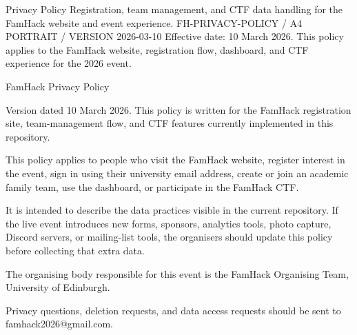 \documentclass[11pt]{article}
\begin{document}
\FHCover
  {Privacy Policy}
  {Registration, team management, and CTF data handling for the FamHack website and event experience.}
  {FH-PRIVACY-POLICY / A4 PORTRAIT / VERSION 2026-03-10}
  {Effective date: 10 March 2026.\newline
  This policy applies to the FamHack website, registration flow, dashboard, and CTF experience for the 2026 event.}

{\fhbold\fontsize{18}{18}\selectfont FamHack Privacy Policy\par}
\vspace{0.3em}
Version dated 10 March 2026. This policy is written for the FamHack registration site, team-management flow, and CTF features currently implemented in this repository.


\vspace{0.6em}

This policy applies to people who visit the FamHack website, register interest in the event, sign in using their university email address, create or join an academic family team, use the dashboard, or participate in the FamHack CTF.

It is intended to describe the data practices visible in the current repository. If the live event introduces new forms, sponsors, analytics tools, photo capture, Discord servers, or mailing-list tools, the organisers should update this policy before collecting that extra data.

The organising body responsible for this event is the FamHack Organising Team, University of Edinburgh.

Privacy questions, deletion requests, and data access requests should be sent to famhack2026@gmail.com.
\end{document}
